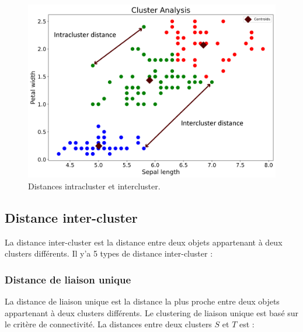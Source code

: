 \begin{figure}[H]
	\begin{center}
		\includegraphics[scale=0.3]{images/chapitre6/iris_inter_intra_clusters.png}
	\end{center}
\caption{Distances intracluster et intercluster.}
\label{inter_intra_clusters}
\end{figure}

\subsection{Distance inter-cluster}
La distance inter-cluster est la distance entre deux objets appartenant à deux clusters différents. Il y’a 5 types de distance inter-cluster :

\subsubsection{Distance de liaison unique}
La distance de liaison unique est la distance la plus proche entre deux objets appartenant à deux clusters différents. Le clustering de liaison unique est basé sur le critère de connectivité. La distances entre deux clusters \(\displaystyle S \) et \(\displaystyle T \) est : \cite{maulik2002performance}


